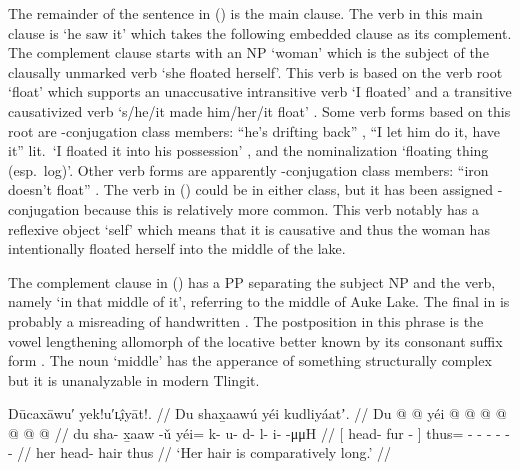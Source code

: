 The remainder of the sentence in (\lastx) is the main clause.
The verb in this main clause is  ‘he saw it’ which takes the following embedded clause as its complement.
The complement clause starts with an NP  ‘woman’ which is the subject of the clausally unmarked verb  ‘she floated herself’.
This verb is based on the verb root  ‘float’ which supports an unaccusative intransitive verb  ‘I floated’ and a transitive causativized verb  ‘s/he/it made him/her/it float’ \parencite[45]{leer:1976}.
Some verb forms based on this root are -conjugation class members:  “he’s drifting back” \parencite[93.1184]{story-naish:1973},  “I let him do it, have it” lit.\ ‘I floated it into his possession’ \parencite[01/94]{leer:1973}, and the nominalization  ‘floating thing (esp.\ log)’.
Other verb forms are apparently -conjugation class members:  “iron doesn’t float” \parencite[93.1183]{story-naish:1973}.
The verb  in (\lastx) could be in either class, but it has been assigned -conjugation because this is relatively more common.
This verb notably has a reflexive object  ‘self’ which means that it is causative and thus the woman has intentionally floated herself into the middle of the lake.

The complement clause in (\lastx) has a PP separating the subject NP and the verb, namely  ‘in that middle of it’, referring to the middle of  Auke Lake.
The final  in  is probably a misreading of handwritten .
The postposition in this phrase is the vowel lengthening allomorph  of the locative better known by its consonant suffix form .
The noun  ‘middle’ has the apperance of something structurally complex but it is unanalyzable in modern Tlingit.

\ex\label{ex:94-4-hair-long}%
%
\begingl
	\glpreamble	Dūcaxāwu′ yek!u′ʟ̣îyāt!. //
	\glpreamble	Du shax̱aawú yéi kudliyáatʼ. //
	\gla	{} Du  @ {} @ {} {} 
		yéi @  @ {} @ {} @ {} @ {} @ {} @ {} //
	\glb	{} du sha- x̱aaw -ǔ {}
		yéi= k- u- d- l- i-  -μμH //
	\glc	{}[  head- fur - {}]
		thus= - - - - -  - //
	\gld	{} her head- hair {} {}
		thus  {} {} {} {} {} {} //
	\glft	‘Her hair is comparatively long.’
		//
\endgl
\xe

